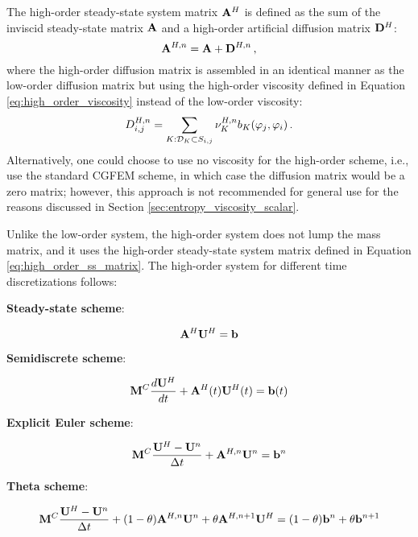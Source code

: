 The high-order steady-state system matrix $\highorderssmatrix$ is defined as
the sum of the inviscid steady-state matrix $\ssmatrix$ and a high-order
artificial diffusion matrix $\highorderdiffusionmatrix$:
\begin{equation}\label{eq:high_order_ss_matrix}
  \highorderssmatrix[\timeindex] = \ssmatrix
  + \highorderdiffusionmatrix[\timeindex] \eqc
\end{equation}
where the high-order diffusion matrix is assembled in an identical manner as
the low-order diffusion matrix but using the high-order viscosity defined in
Equation \eqref{eq:high_order_viscosity} instead of the low-order viscosity:
\begin{equation}
  \diffusionmatrixletter^{H,\timeindex}_{i,j}
  = \sumKSij\highordercellviscosity[\timeindex]
  \localviscbilinearform{\cellindex}{j}{i} \eqp
\end{equation}
Alternatively, one could choose to use no viscosity for the high-order scheme,
i.e., use the standard CGFEM scheme, in which case the diffusion matrix
would be a zero matrix; however, this approach is not recommended for general use
for the reasons discussed in Section \ref{sec:entropy_viscosity_scalar}.

Unlike the low-order system, the high-order system does not lump the
mass matrix, and it uses the high-order steady-state system matrix
defined in Equation \eqref{eq:high_order_ss_matrix}. The high-order
system for different time discretizations follows:
\begin{center}{\textbf{Steady-state scheme}:}\end{center}
\begin{equation}\label{eq:high_ss}
   \highorderssmatrix\highordersolution = \ssrhs
\end{equation}
\begin{center}{\textbf{Semidiscrete scheme}:}\end{center}
\begin{equation}\label{eq:high_semidiscrete}
   \consistentmassmatrix\ddt{\highordersolution}
    + \highorderssmatrix(\timevalue)\highordersolution(\timevalue) 
    = \ssrhs(\timevalue)
\end{equation}
\begin{center}{\textbf{Explicit Euler scheme}:}\end{center}
\begin{equation}\label{eq:high_FE}
  \consistentmassmatrix\frac{\highordersolution-\solutionvector^{\timeindex}}
  {\timestepsize}
  + \highorderssmatrix[\timeindex]\solutionvector^{\timeindex}
  = \ssrhs^\timeindex
\end{equation}
\begin{center}{\textbf{Theta scheme}:}\end{center}
\begin{equation}\label{eq:high_theta}
  \consistentmassmatrix\frac{\highordersolution-\solutionvector^\timeindex}
  {\timestepsize}
  + (1-\theta)\highorderssmatrix[\timeindex]\solutionvector^\timeindex
  + \theta\highorderssmatrix[\timeindex+1]\highordersolution
  = (1-\theta)\ssrhs^\timeindex + \theta\ssrhs^{\timeindex+1}
\end{equation}
